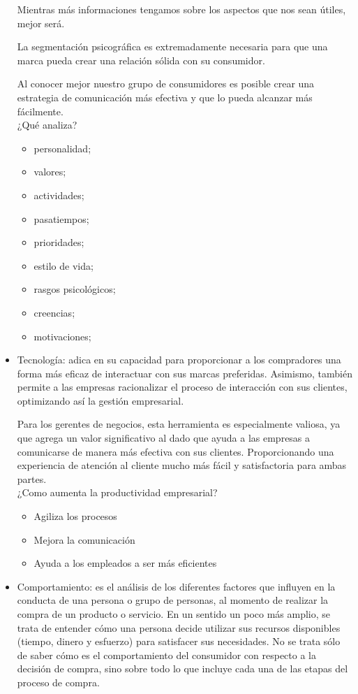\documentclass[letterpaper,12pt]{article}
\begin{document}
\begin{sloppypar}
\begin{itemize}
    Mientras más informaciones tengamos sobre los aspectos que nos sean útiles, mejor será.

    La segmentación psicográfica es extremadamente necesaria para que una marca pueda crear una relación sólida con su consumidor.

    Al conocer mejor nuestro grupo de consumidores es posible crear una estrategia de comunicación más efectiva y que lo pueda alcanzar más fácilmente.
    \vspace{0.3cm}\\
    ¿Qué analiza?
    \begin{itemize}
        \item personalidad;
        \item valores;
        \item actividades;
        \item pasatiempos;
        \item prioridades;
        \item estilo de vida;
        \item rasgos psicológicos;
        \item creencias;
        \item motivaciones;
    \end{itemize}
    \item Tecnología: adica en su capacidad para proporcionar a los compradores una forma más eficaz de interactuar con sus marcas preferidas. Asimismo, también permite a las empresas racionalizar el proceso de interacción con sus clientes, optimizando así la gestión empresarial.
    
    Para los gerentes de negocios, esta herramienta es especialmente valiosa, ya que agrega un valor significativo al dado que ayuda a las empresas a comunicarse de manera más efectiva con sus clientes. Proporcionando una experiencia de atención al cliente mucho más fácil y satisfactoria para ambas partes.
    \vspace{0.3cm}\\ 
    ¿Como aumenta la productividad empresarial?
    \begin{itemize}
        \item Agiliza los procesos
        \item Mejora la comunicación
        \item Ayuda a los empleados a ser más eficientes
    \end{itemize}
    \item Comportamiento: es el análisis de los diferentes factores que influyen en la conducta de una persona o grupo de personas, al momento de realizar la compra de un producto o servicio. En un sentido un poco más amplio, se trata de entender cómo una persona decide utilizar sus recursos disponibles (tiempo, dinero y esfuerzo) para satisfacer sus necesidades.
    No se trata sólo de saber cómo es el comportamiento del consumidor con respecto a la decisión de compra, sino sobre todo lo que incluye cada una de las etapas del proceso de compra.


\end{itemize}
\end{sloppypar}
\end{document}
